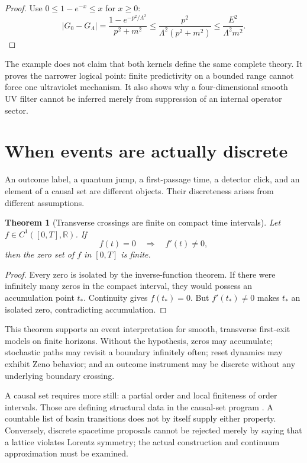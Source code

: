 \documentclass[11pt]{article}
\newtheorem{theorem}{Theorem}[section]
\theoremstyle{definition}
\theoremstyle{remark}
\newcommand{\R}{\mathbb{R}}
\begin{document}
\begin{proof}
Use \(0\leq 1-e^{-x}\leq x\) for \(x\geq0\):
\[
 |G_0-G_\Lambda|
 =
 \frac{1-e^{-p^2/\Lambda^2}}{p^2+m^2}
 \leq
 \frac{p^2}{\Lambda^2(p^2+m^2)}
 \leq
 \frac{E^2}{\Lambda^2m^2}.
\]
\end{proof}

The example does not claim that both kernels define the same complete theory.
It proves the narrower logical point: finite predictivity on a bounded range
cannot force one ultraviolet mechanism. It also shows why a four-dimensional
smooth UV filter cannot be inferred merely from suppression of an internal
operator sector.

\section{When events are actually discrete}
\label{sec:events}

An outcome label, a quantum jump, a first-passage time, a detector click, and an
element of a causal set are different objects. Their discreteness arises from
different assumptions.

\begin{theorem}[Transverse crossings are finite on compact time intervals]
\label{thm:transverse-events}
Let \(f\in C^1([0,T],\R)\). If
\[
 f(t)=0\quad\Longrightarrow\quad f'(t)\neq0,
\]
then the zero set of \(f\) in \([0,T]\) is finite.
\end{theorem}

\begin{proof}
Every zero is isolated by the inverse-function theorem. If there were
infinitely many zeros in the compact interval, they would possess an
accumulation point \(t_\ast\). Continuity gives \(f(t_\ast)=0\). But
\(f'(t_\ast)\neq0\) makes \(t_\ast\) an isolated zero, contradicting
accumulation.
\end{proof}

This theorem supports an event interpretation for smooth, transverse
first-exit models on finite horizons. Without the hypothesis, zeros may
accumulate; stochastic paths may revisit a boundary infinitely often; reset
dynamics may exhibit Zeno behavior; and an outcome instrument may be discrete
without any underlying boundary crossing.

A causal set requires more still: a partial order and local finiteness of order
intervals. Those are defining structural data in the causal-set program
\cite{BombelliEtAl1987}. A countable list of basin transitions does not by
itself supply either property. Conversely, discrete spacetime proposals cannot
be rejected merely by saying that a lattice violates Lorentz symmetry; the
actual construction and continuum approximation must be examined.
\end{document}
